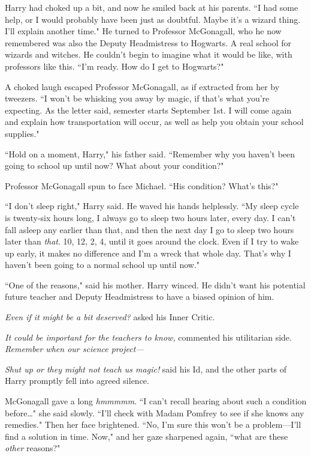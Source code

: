 Harry had choked up a bit, and now he smiled back at his parents. ``I had some help, or I would probably have been just as doubtful. Maybe it's a wizard thing. I'll explain another time." He turned to Professor McGonagall, who he now remembered was also the Deputy Headmistress to Hogwarts. A real school for wizards and witches. He couldn't begin to imagine what it would be like, with professors like this. ``I'm ready. How do I get to Hogwarts?"

A choked laugh escaped Professor McGonagall, as if extracted from her by tweezers. ``I won't be whisking you away by magic, if that's what you're expecting. As the letter said, semester starts September 1st. I will come again and explain how transportation will occur, as well as help you obtain your school supplies."

``Hold on a moment, Harry," his father said. ``Remember why you haven't been going to school up until now? What about your condition?"

Professor McGonagall spun to face Michael. ``His condition? What's this?"

``I don't sleep right," Harry said. He waved his hands helplessly. ``My sleep cycle is twenty-six hours long, I always go to sleep two hours later, every day. I can't fall asleep any earlier than that, and then the next day I go to sleep two hours later than \emph{that}. 10\pm, 12\am, 2\am, 4\am, until it goes around the clock. Even if I try to wake up early, it makes no difference and I'm a wreck that whole day. That's why I haven't been going to a normal school up until now."

``One of the reasons," said his mother. Harry winced. He didn't want his potential future teacher and Deputy Headmistress to have a biased opinion of him.

\emph{Even if it might be a bit deserved?} asked his Inner Critic.

\emph{It could be important for the teachers to know,} commented his utilitarian side. \emph{Remember when our science project---}

\emph{Shut up or they might not teach us magic!} said his Id, and the other parts of Harry promptly fell into agreed silence.

McGonagall gave a long \emph{hmmmmm}. ``I can't recall hearing about such a condition before{\ldots}" she said slowly. ``I'll check with Madam Pomfrey to see if she knows any remedies." Then her face brightened. ``No, I'm sure this won't be a problem---I'll find a solution in time. Now," and her gaze sharpened again, ``what are these \emph{other} reasons?"

